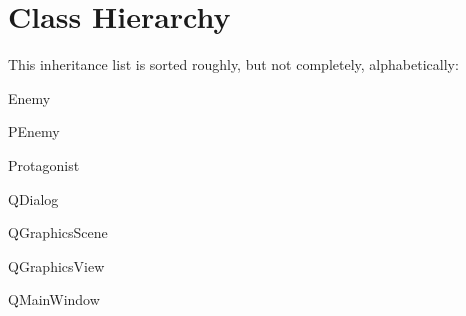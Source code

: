 \section{Class Hierarchy}
This inheritance list is sorted roughly, but not completely, alphabetically\+:\begin{DoxyCompactList}
\item {}
\item Enemy\begin{DoxyCompactList}
\item {}
\end{DoxyCompactList}
\item {}
\item {}
\item P\+Enemy\begin{DoxyCompactList}
\item {}
\end{DoxyCompactList}
\item Protagonist\begin{DoxyCompactList}
\item {}
\end{DoxyCompactList}
\item Q\+Dialog\begin{DoxyCompactList}
\item {}
\end{DoxyCompactList}
\item Q\+Graphics\+Scene\begin{DoxyCompactList}
\item {}
\end{DoxyCompactList}
\item Q\+Graphics\+View\begin{DoxyCompactList}
\item {}
\end{DoxyCompactList}
\item Q\+Main\+Window\begin{DoxyCompactList}
\item {}

\end{DoxyCompactList}
\end{DoxyCompactList}
